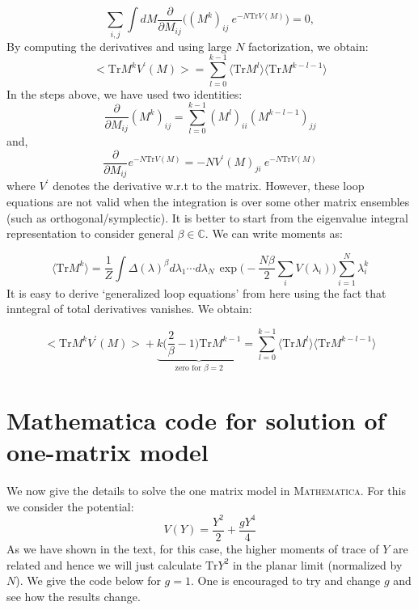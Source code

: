 \documentclass[11pt]{article}
\begin{document}
\begin{equation}
	\sum_{i,j} \int dM \frac{\partial}{\partial M_{ij}} \Bigg( (M^k)_{ij}~e^{-N\mathrm{Tr} V(M)}\Bigg) = 0, 
\end{equation}
By computing the derivatives and using large $N$ factorization, we obtain:
\begin{equation}
	\Big< \mathrm{Tr} M^{k} V^{\prime}(M) \Big> = \sum_{l=0}^{k-1} \langle \mathrm{Tr} M^{l} \rangle  \langle \mathrm{Tr} M^{k-l-1} \rangle
\end{equation}
In the steps above, we have used two identities:
\begin{equation}
	\frac{\partial}{\partial M_{ij}} (M^{k})_{ij} = \sum_{l=0}^{k-1} (M^{l})_{ii} (M^{k-l-1})_{jj}
\end{equation}
and, 
\begin{equation}
	\frac{\partial}{\partial M_{ij}} e^{-N\mathrm{Tr} V(M)} = -N V^{\prime}(M)_{ji}~e^{-N\mathrm{Tr} V(M)}
\end{equation}
where $V^{\prime}$ denotes the derivative w.r.t to the matrix. 
However, these loop equations are not valid when the integration is over some other matrix ensembles (such as orthogonal/symplectic). It is better to start from the eigenvalue integral representation to consider general $\beta \in \mathbb{C}$. We can write moments as:

\begin{equation} 
\langle \mbox{Tr} M^k  \rangle = \frac{1}{Z} \int \Delta(\lambda)^{\beta} 
	d\lambda_1 \cdots d\lambda_{N~} \exp\Bigg(-\frac{N\beta}{2} \sum_{i} V(\lambda_{i})\Bigg)  \sum_{i=1}^{N} \lambda_{i}^k
\end{equation}
It is easy to derive `generalized loop equations' from here using the fact that inntegral of total derivatives vanishes. We obtain:

\begin{equation}
		\Big< \mathrm{Tr} M^{k} V^{\prime}(M) \Big> +  \underbrace{k \Bigg(\frac{2}{\beta} - 1 \Bigg) \mathrm{Tr} M^{k-1}}_{\text{zero for $\beta=2$}} = \sum_{l=0}^{k-1} \langle \mathrm{Tr} M^{l} \rangle  \langle \mathrm{Tr} M^{k-l-1} \rangle
\end{equation}


\section{Mathematica code for solution of one-matrix model}

We now give the details to solve the one matrix model in \textsc{Mathematica}. For this we consider the potential:
\[ V(Y) = \frac{Y^2}{2} + \frac{gY^4}{4} \] 
As we have shown in the text, for this case, the higher moments of trace of $Y$ are related and hence we will just calculate $\mbox{Tr}Y^2$ in the planar limit (normalized by $N$). We give the code below for $g=1$. One is encouraged to try and change $g$ and see how the results change.
\end{document}
